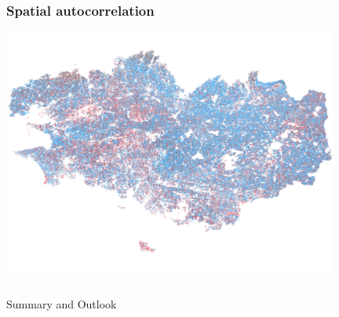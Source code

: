 \documentclass[%
  aspectratio=169,
  9pt,
  USenglish,
  titlegraphic, %
  affiliationintitlepagehead,
  affiliation,
]{beamer}
\begin{document}
\begin{frame}
\frametitle{Spatial autocorrelation}

\includegraphics[width=11cm]{images/map/breizh}


\end{frame}

{
\begin{frame}[plain]

\vfill
\Huge\color{white}
\begin{center}
\begin{columns}
\vspace{7em}

\hfill 
Summary and Outlook

\end{columns}
\end{center}

\vfill
\end{frame}
}
\end{document}
